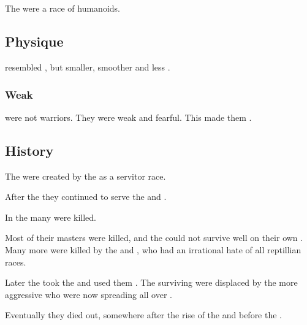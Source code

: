 \section[Locul]{\Locul}
\index{\locul}
The \loculs{} were a race of \saurian{} humanoids.









\subsection{Physique}
\Loculs{} resembled \scathae{}, but smaller, smoother and less \armoured. 





\subsubsection{Weak}
\Loculs{} were not warriors.
They were weak and fearful. 
This made them . 









\subsection{History}
The \loculs{} were created by the \ophidians{} as a servitor race.

After the \firstbanewar{} they continued to serve the \dragons{} and \quiljaaran. 

In the  many \loculs{} were killed. 

Most of their \quiljaaran{} masters were killed, and the \loculs{} could not survive well on their own . 
Many more were killed by the \aryothim{} and \nephilim, who had an irrational hate of all reptillian races. 

Later the \dzraicchenosses{} took the \loculs{} and used them . 
The surviving \loculs{} were displaced by the more aggressive \scathae{} who were now spreading all over \Miith. 

Eventually they died out, somewhere after the rise of the \dzraicchenosses{} and before the \secondbanewar. 





